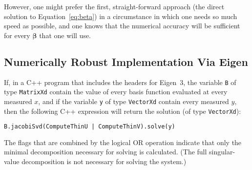 \documentclass[twocolumn]{article}
\begin{document}
However, one might prefer the first, straight-forward approach (the direct
solution to Equation~\ref{eq:beta}) in a circumstance in which one needs so
much speed as possible, and one knows that the numerical accuracy will be
sufficient for every $\boldsymbol{\beta}$ that one will use.

\subsection{Numerically Robust Implementation Via Eigen}

If, in a C++ program that includes the headers for Eigen~3, the variable
\texttt{B} of type \texttt{MatrixXd} contain the value of every basis function
evaluated at every measured $x$, and if the variable \texttt{y} of type
\texttt{VectorXd} contain every measured $y$, then the following C++ expression
will return the solution (of type \texttt{VectorXd}):
\begin{small}
\begin{verbatim}
B.jacobiSvd(ComputeThinU | ComputeThinV).solve(y)
\end{verbatim}
\end{small}
The flags that are combined by the logical OR operation indicate that only the
minimal decomposition necessary for solving is calculated. (The full
singular-value decomposition is not necessary for solving the system.)

%
%
%
%

\newpage


\end{document}
